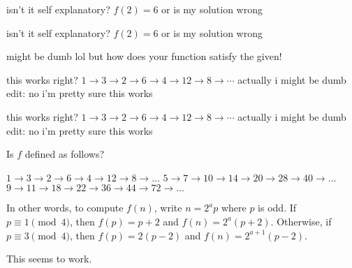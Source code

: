 \begin{solution}
	isn't it self explanatory? $f(2)=6$
or is my solution wrong
\end{solution}



\begin{solution}
	\begin{tcolorbox}isn't it self explanatory? $f(2)=6$
or is my solution wrong\end{tcolorbox}

might be dumb lol but how does your function satisfy the given!
\end{solution}



\begin{solution}
	this works right?
$1\to3\to2\to6\to4\to12\to8\to\cdots$
actually i might be dumb
edit: no i'm pretty sure this works
\end{solution}



\begin{solution}
	\begin{tcolorbox}this works right?
$1\to3\to2\to6\to4\to12\to8\to\cdots$
actually i might be dumb
edit: no i'm pretty sure this works\end{tcolorbox}

Is $f$ defined as follows?

$1 \to 3 \to 2 \to 6 \to 4 \to 12 \to 8 \to \ldots$
$5 \to 7 \to 10 \to 14 \to 20 \to 28 \to 40 \to \ldots$
$9 \to 11 \to 18 \to 22 \to 36 \to 44 \to 72 \to \ldots$

In other words, to compute $f(n)$, write $n = 2^a p$ where $p$ is odd. If $p \equiv 1 \pmod{4}$, then $f(p) = p+2$ and $f(n) = 2^a(p+2)$. Otherwise, if $p \equiv 3 \pmod{4}$, then $f(p) = 2(p-2)$ and $f(n) = 2^{a+1}(p-2)$.

This seems to work.
\end{solution}



